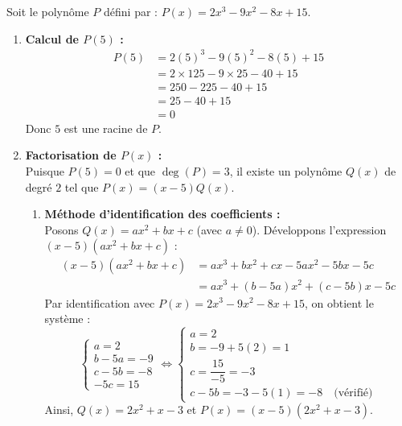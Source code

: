 \documentclass[12pt,a4paper]{article}
\begin{document}

Soit le polynôme $P$ défini par : $P(x) = 2x^3 - 9x^2 - 8x + 15$.

\begin{enumerate}
    \item \textbf{Calcul de $P(5)$ :}
    \begin{align*}
        P(5) &= 2(5)^3 - 9(5)^2 - 8(5) + 15 \\
             &= 2 \times 125 - 9 \times 25 - 40 + 15 \\
             &= 250 - 225 - 40 + 15 \\
             &= 25 - 40 + 15 \\
             &= 0
    \end{align*}
    Donc $5$ est une racine de $P$.

    \item \textbf{Factorisation de $P(x)$ :} \\
    Puisque $P(5) = 0$ et que $\deg(P) = 3$, il existe un polynôme $Q(x)$ de degré $2$ tel que $P(x) = (x - 5)Q(x)$.

    \begin{enumerate}
        \item \textbf{Méthode d'identification des coefficients :} \\
        Posons $Q(x) = ax^2 + bx + c$ (avec $a \neq 0$). Développons l'expression $(x - 5)(ax^2 + bx + c)$ :
        \begin{align*}
            (x - 5)(ax^2 + bx + c) &= ax^3 + bx^2 + cx - 5ax^2 - 5bx - 5c \\
                                   &= ax^3 + (b - 5a)x^2 + (c - 5b)x - 5c
        \end{align*}
        Par identification avec $P(x) = 2x^3 - 9x^2 - 8x + 15$, on obtient le système :
        \[
        \begin{cases}
            a = 2 \\
            b - 5a = -9 \\
            c - 5b = -8 \\
            -5c = 15
        \end{cases}
        \iff
        \begin{cases}
            a = 2 \\
            b = -9 + 5(2) = 1 \\
            c = \dfrac{15}{-5} = -3 \\
            c - 5b = -3 - 5(1) = -8 \quad \text{(vérifié)}
        \end{cases}
        \]
        Ainsi, $Q(x) = 2x^2 + x - 3$ et $P(x) = (x - 5)(2x^2 + x - 3)$.


\end{enumerate}
\end{enumerate}
\end{document}
